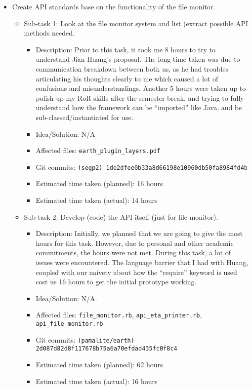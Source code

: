 \begin{itemize}
	\item Create API standards base on the functionality of the file monitor.
	     \begin{itemize}
	        \item Sub-task 1: Look at the file monitor system and list (extract possible API methods needed.
	           \begin{itemize}
					\item Description: Prior to this task, it took me 8 hours to try to understand Jian Huang's proposal. The long time taken was due to communication breakdown between both us, as he had troubles articulating his thoughts clearly to me which caused a lot of confusions and misunderstandings. Another 5 hours were taken up to polish up my RoR skills after the semester break, and trying to fully understand how the framework can be ``imported'' like Java, and be sub-classed/instantiated for use.
					\item Idea/Solution: N/A
					\item Affected files: \texttt{earth\_plugin\_layers.pdf}
					\item Git commits: \texttt{(segp2) 1de2dfee0b33a8d66198e10960db50fa8984fd4b}
					\item Estimated time taken (planned): 16 hours
					\item Estimated time taken (actual): 14 hours
				\end{itemize}
			\item Sub-task 2: Develop (code) the API itself (just for file monitor).
			   \begin{itemize}
					\item Description: Initially, we planned that we are going to give the most hours for this task. However, due to personal and other academic commitments, the hours were not met. During this task, a lot of issues were encountered. The language barrier that I had with Huang, coupled with our naivety about how the ``require'' keyword is used cost us 16 hours to get the initial prototype working. 
					\item Idea/Solution: N/A. 
					\item Affected files: \texttt{file\_monitor.rb}, \texttt{api\_eta\_printer.rb}, \texttt{api\_file\_monitor.rb}
					\item Git commits: \texttt{(pamalite/earth) 2d087d82d8f117678b75a6a70efdad435fc0f8c4}
					\item Estimated time taken (planned): 62 hours
					\item Estimated time taken (actual): 16 hours

\end{itemize}
\end{itemize}
\end{itemize}
